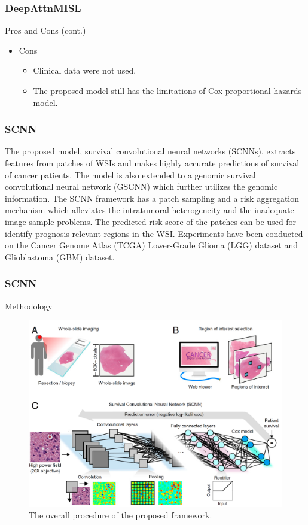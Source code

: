 \documentclass{beamer}
\begin{document}
	\begin{frame}
		\frametitle{DeepAttnMISL}
		Pros and Cons (cont.)
		\begin{itemize}
			\item Cons
			\begin{itemize}
				\item Clinical data were not used.
				\item The proposed model still has the limitations of Cox proportional hazards model.
			\end{itemize}
		\end{itemize}
	\end{frame}
	
	\begin{frame}
		\frametitle{SCNN}
		The proposed model, survival convolutional neural networks (SCNNs), extracts features from patches of WSIs and makes highly accurate predictions of survival of cancer patients. The model is also extended to a genomic survival convolutional neural network (GSCNN) which further utilizes the genomic information. The SCNN framework has a patch sampling and a risk aggregation mechanism which alleviates the intratumoral heterogeneity and the inadequate image sample problems. The predicted risk score of the patches can be used for identify prognosis relevant regions in the WSI. Experiments have been conducted on the Cancer Genome Atlas (TCGA) Lower-Grade Glioma (LGG) dataset and Glioblastoma (GBM) dataset.
	\end{frame}
	
	\begin{frame}
		\frametitle{SCNN}
		Methodology
		
		\begin{figure}[H]
			\centering
			\includegraphics[scale=0.12]{figures/scnn-overall.png}
			\caption{The overall procedure of the proposed framework.}
			\label{fig:scnn-overall}
		\end{figure}
	\end{frame}
\end{document}
